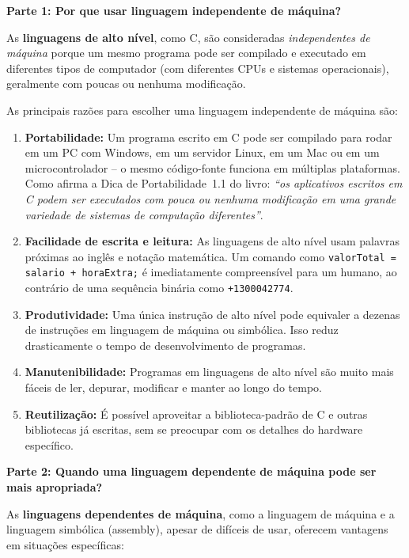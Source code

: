 \documentclass[12pt,a4paper]{article}
\begin{document}
\begin{respostabox}

\textbf{Parte 1: Por que usar linguagem independente de máquina?}

As \textbf{linguagens de alto nível}, como C, são consideradas \textit{independentes de
máquina} porque um mesmo programa pode ser compilado e executado em diferentes tipos de
computador (com diferentes CPUs e sistemas operacionais), geralmente com poucas ou nenhuma
modificação.

As principais razões para escolher uma linguagem independente de máquina são:

\begin{enumerate}
  \item \textbf{Portabilidade:} Um programa escrito em C pode ser compilado para rodar em
  um PC com Windows, em um servidor Linux, em um Mac ou em um microcontrolador -- o mesmo
  código-fonte funciona em múltiplas plataformas. Como afirma a Dica de
  Portabilidade~1.1 do livro: \textit{``os aplicativos escritos em C podem ser executados
  com pouca ou nenhuma modificação em uma grande variedade de sistemas de computação
  diferentes''}.

  \item \textbf{Facilidade de escrita e leitura:} As linguagens de alto nível usam palavras
  próximas ao inglês e notação matemática. Um comando como
  \texttt{valorTotal = salario + horaExtra;} é imediatamente compreensível para um
  humano, ao contrário de uma sequência binária como \texttt{+1300042774}.

  \item \textbf{Produtividade:} Uma única instrução de alto nível pode equivaler a dezenas
  de instruções em linguagem de máquina ou simbólica. Isso reduz drasticamente o tempo
  de desenvolvimento de programas.

  \item \textbf{Manutenibilidade:} Programas em linguagens de alto nível são muito mais
  fáceis de ler, depurar, modificar e manter ao longo do tempo.

  \item \textbf{Reutilização:} É possível aproveitar a biblioteca-padrão de C e outras
  bibliotecas já escritas, sem se preocupar com os detalhes do hardware específico.
\end{enumerate}

\bigskip
\textbf{Parte 2: Quando uma linguagem dependente de máquina pode ser mais apropriada?}

As \textbf{linguagens dependentes de máquina}, como a linguagem de máquina e a linguagem
simbólica (assembly), apesar de difíceis de usar, oferecem vantagens em situações específicas:


\end{respostabox}
\end{document}
